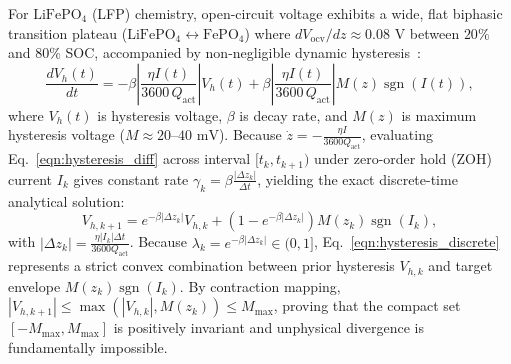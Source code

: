 \documentclass[balance,nocopyright,upint,varvw,hyphenate,barcolor=NavyBlue,nolists]{asmejour}
\begin{document}
For $\text{LiFePO}_4$ (LFP) chemistry, open-circuit voltage exhibits a wide, flat biphasic transition plateau ($\text{LiFePO}_4 \leftrightarrow \text{FePO}_4$) where $d V_{\text{ocv}} / dz \approx 0.08\text{ V}$ between $20\%$ and $80\%$ SOC, accompanied by non-negligible dynamic hysteresis~\cite{Roscher2011hysteresis,Verbrugge2004hysteresis}:
\begin{equation}\label{eqn:hysteresis_diff}
\frac{d V_h(t)}{dt} = -\beta \left| \frac{\eta I(t)}{3600\,Q_{\text{act}}} \right| V_h(t) + \beta \left| \frac{\eta I(t)}{3600\,Q_{\text{act}}} \right| M(z) \operatorname{sgn}(I(t)),
\end{equation}
where $V_h(t)$ is hysteresis voltage, $\beta$ is decay rate, and $M(z)$ is maximum hysteresis voltage ($M \approx 20\text{--}40\text{ mV}$). Because $\dot{z} = -\frac{\eta I}{3600 Q_{\text{act}}}$, evaluating Eq.~\eqref{eqn:hysteresis_diff} across interval $[t_k, t_{k+1})$ under zero-order hold (ZOH) current $I_k$ gives constant rate $\gamma_k = \beta \frac{|\Delta z_k|}{\Delta t}$, yielding the exact discrete-time analytical solution:
\begin{equation}\label{eqn:hysteresis_discrete}
V_{h,k+1} = e^{-\beta |\Delta z_k|} V_{h,k} + \left(1 - e^{-\beta |\Delta z_k|}\right) M(z_k) \operatorname{sgn}(I_k),
\end{equation}
with $|\Delta z_k| = \frac{\eta |I_k| \Delta t}{3600 Q_{\text{act}}}$. Because $\lambda_k = e^{-\beta |\Delta z_k|} \in (0, 1]$, Eq.~\eqref{eqn:hysteresis_discrete} represents a strict convex combination between prior hysteresis $V_{h,k}$ and target envelope $M(z_k)\operatorname{sgn}(I_k)$. By contraction mapping, $|V_{h,k+1}| \le \max(|V_{h,k}|, M(z_k)) \le M_{\max}$, proving that the compact set $[-M_{\max}, M_{\max}]$ is positively invariant and unphysical divergence is fundamentally impossible.
\end{document}

